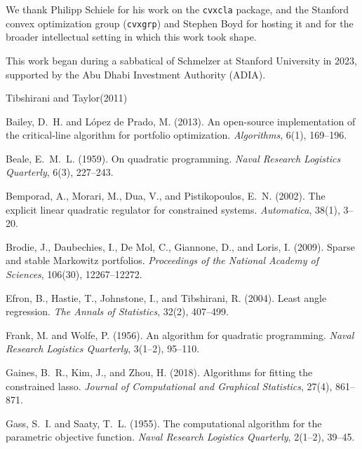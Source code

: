 \documentclass[sts]{imsart}
\theoremstyle{plain}
\theoremstyle{definition}
\begin{document}
\begin{acks}[Acknowledgments]
We thank Philipp Schiele for his work on the \texttt{cvxcla} package, and the Stanford
convex optimization group (\texttt{cvxgrp}) and Stephen Boyd for hosting it and for the
broader intellectual setting in which this work took shape.
\end{acks}

\begin{funding}
This work began during a sabbatical of Schmelzer at Stanford University in 2023,
supported by the Abu Dhabi Investment Authority (ADIA).
\end{funding}

\begin{thebibliography}{Tibshirani and Taylor(2011)}

 Bailey, D.~H. and
L\'opez de Prado, M. (2013). An open-source implementation of the critical-line
algorithm for portfolio optimization. \emph{Algorithms}, 6(1), 169--196.

 Beale, E.~M.~L. (1959). On quadratic programming.
\emph{Naval Research Logistics Quarterly}, 6(3), 227--243.

 Bemporad, A., Morari, M., Dua, V., and
Pistikopoulos, E.~N. (2002). The explicit linear quadratic regulator for constrained
systems. \emph{Automatica}, 38(1), 3--20.

 Brodie, J., Daubechies, I., De Mol, C.,
Giannone, D., and Loris, I. (2009). Sparse and stable Markowitz portfolios.
\emph{Proceedings of the National Academy of Sciences}, 106(30), 12267--12272.

 Efron, B., Hastie, T., Johnstone, I., and
Tibshirani, R. (2004). Least angle regression. \emph{The Annals of Statistics},
32(2), 407--499.

 Frank, M. and Wolfe, P. (1956). An
algorithm for quadratic programming. \emph{Naval Research Logistics Quarterly},
3(1--2), 95--110.

 Gaines, B.~R., Kim, J., and Zhou, H.
(2018). Algorithms for fitting the constrained lasso. \emph{Journal of Computational
and Graphical Statistics}, 27(4), 861--871.

 Gass, S.~I. and Saaty, T.~L. (1955). The
computational algorithm for the parametric objective function. \emph{Naval Research
Logistics Quarterly}, 2(1--2), 39--45.


\end{thebibliography}
\end{document}

